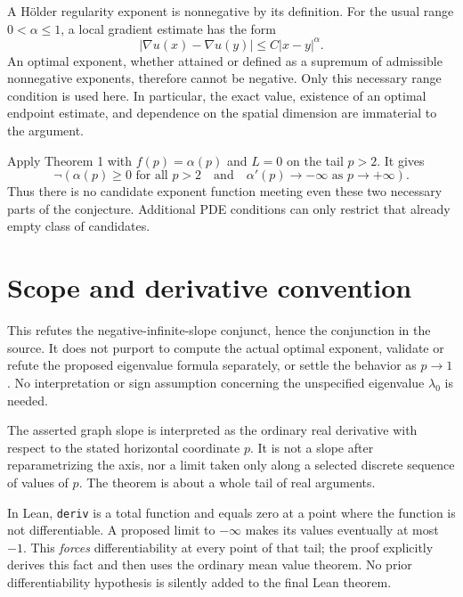 \documentclass[11pt]{article}
\begin{document}
A H\"older regularity exponent is nonnegative by its definition.
For the usual range $0<\alpha\leq1$, a local gradient estimate has
the form
\[
 |\nabla u(x)-\nabla u(y)|\leq C|x-y|^\alpha.
\]
An optimal exponent, whether attained or defined as a supremum of
admissible nonnegative exponents, therefore cannot be negative.
Only this necessary range condition is used here. In particular,
the exact value, existence of an optimal endpoint estimate, and
dependence on the spatial dimension are immaterial to the argument.

Apply Theorem 1 with $f(p)=\alpha(p)$ and $L=0$ on the tail $p>2$.
It gives
\[
 \neg\left(\alpha(p)\geq0\text{ for all }p>2
       \quad\text{and}\quad
       \alpha'(p)\longrightarrow-\infty
                     \text{ as }p\to+\infty\right).
\]
Thus there is no candidate exponent function meeting even these
two necessary parts of the conjecture. Additional PDE conditions
can only restrict that already empty class of candidates.

\section*{Scope and derivative convention}
This refutes the negative-infinite-slope conjunct, hence the
conjunction in the source. It does not purport to compute the
actual optimal exponent, validate or refute the proposed
eigenvalue formula separately, or settle the behavior as
$p\to1$. No interpretation or sign assumption concerning the
unspecified eigenvalue $\lambda_0$ is needed.

The asserted graph slope is interpreted as the ordinary real
derivative with respect to the stated horizontal coordinate $p$.
It is not a slope after reparametrizing the axis, nor a limit taken
only along a selected discrete sequence of values of $p$.
The theorem is about a whole tail of real arguments.

In Lean, \texttt{deriv} is a total function and equals zero at a
point where the function is not differentiable. A proposed limit
to $-\infty$ makes its values eventually at most $-1$. This
\emph{forces} differentiability at every point of that tail;
the proof explicitly derives this fact and then uses the
ordinary mean value theorem. No prior differentiability
hypothesis is silently added to the final Lean theorem.

\newpage
\end{document}
